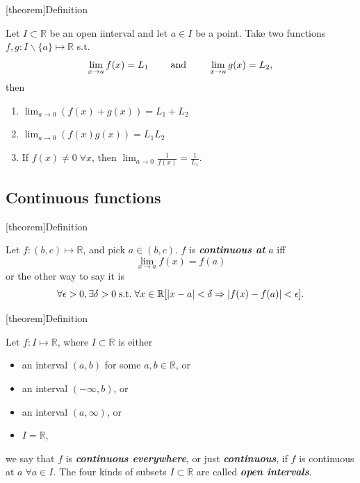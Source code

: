 \documentclass[12pt]{report}
\theoremstyle{definition}
\begin{document}
[theorem]{Definition}
\begin{Algebra of limits}
    Let $I\subset \mathbb{R}$ be an open iinterval and let $a\in I$ be a point.
    Take two functions $f,g:I\backslash\{a\}\mapsto\mathbb{R}$ s.t.\[
        \lim_{x\rightarrow{}a} f(x) = L_1 \qquad\;\textnormal{and}\;\qquad
        \lim_{x\to a} g(x) = L_2,
    \]then
    \begin{enumerate}
        \item $\lim_{a\to 0}(f(x)+g(x)) = L_1 + L_2$
        \item $\lim_{a\rightarrow{}0}(f(x)g(x)) = L_1L_2$
        \item If $f(x)\neq 0 \;\forall x$, then $\lim_{a\to{}0}\frac{1}{f(x)}=\frac{1}{L_1}$.
    \end{enumerate}
\end{Algebra of limits}

\subsection{Continuous functions}

[theorem]{Definition}
\begin{continuous at a}
    Let $f:(b,c)\mapsto\mathbb{R}$, and pick $a\in(b,c)$.
    $f$ is \textbf{\emph{continuous at}} $a$ iff\[
        \lim_{x\rightarrow{}a}f(x) = f(a)
    \]or the other way to say it is\[
        \forall \epsilon>0, \exists \delta>0 \;\textnormal{s.t.}\;
        \forall x\in\mathbb{R}[|x-a|<\delta \Rightarrow{}|f(x) - f(a)|<\epsilon].
    \]
\end{continuous at a}

[theorem]{Definition}
\begin{continuous function}
    Let $f:I\mapsto\mathbb{R}$, where $I\subset\mathbb{R}$ is either
    \begin{itemize}
        \item an interval $(a,b)$ for some $a,b\in\mathbb{R}$, or
        \item an interval $(-\infty, b)$, or
        \item an interval $(a, \infty)$, or
        \item $I = \mathbb{R}$,
    \end{itemize}
    we say that $f$ is \textbf{\emph{continuous everywhere}}, or just \textbf{\emph{continuous}},
    if $f$ is continuous at $a \;\forall a\in I$.
    The four kinds of subsets $I\subset\mathbb{R}$ are called \textbf{\emph{open intervals}}.
\end{continuous function}
\end{document}
